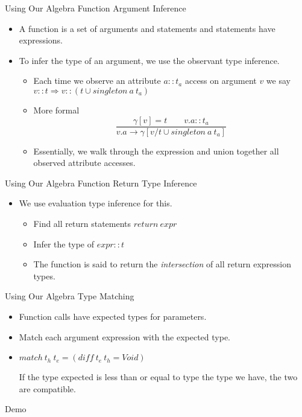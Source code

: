\documentclass[12pt,t]{beamer}
\newcommand{\bi}{\begin{itemize}}
\newcommand{\ei}{\end{itemize}}
\newcommand{\subt}[1]{{\footnotesize \color{subtitle} {#1}}}
\newcommand{\vitem}{\vfill\item}
\begin{document}
\begin{frame}{Using Our Algebra}
    \subt{Function Argument Inference}

    \bi
        \vitem A function is a set of arguments and statements and statements
        have expressions.

        \vitem To infer the type of an argument, we use the observant type inference.
        \bi
            \vitem Each time we observe an attribute $a :: t_a$ access on argument $v$
            we say $v :: t \Rightarrow v :: (t \cup singleton\ a\ t_a)$
            \vitem More formal
            \[
                \frac {
                    \gamma[v] = t\qquad v.a :: t_a
                } {
                    v.a \rightarrow \gamma[v/t \cup singleton\ a\ t_a]
                }
            \]
            \vitem Essentially, we walk through the expression and union together
            all observed attribute accesses.
        \ei
    \ei
\end{frame}

\begin{frame}{Using Our Algebra}
    \subt{Function Return Type Inference}

    \bi
        \vitem We use evaluation type inference for this.
        \bi
            \vitem Find all return statements $return\ expr$
            \vitem Infer the type of $expr :: t$
            \vitem The function is said to return the \emph{intersection}
                of all return expression types.
        \ei
    \ei
\end{frame}

\begin{frame}{Using Our Algebra}
    \subt{Type Matching}

    \bi
        \vitem Function calls have expected types for parameters.
        \vitem Match each argument expression with the expected type.
        \vitem $match\ t_h\ t_e = (diff\ t_e\ t_h = Void)$

        If the type expected is less than or equal to type the type we have,
        the two are compatible.
    \ei
\end{frame}

\begin{frame}
    \vfill
    \centering\large Demo
\end{frame}
\end{document}
